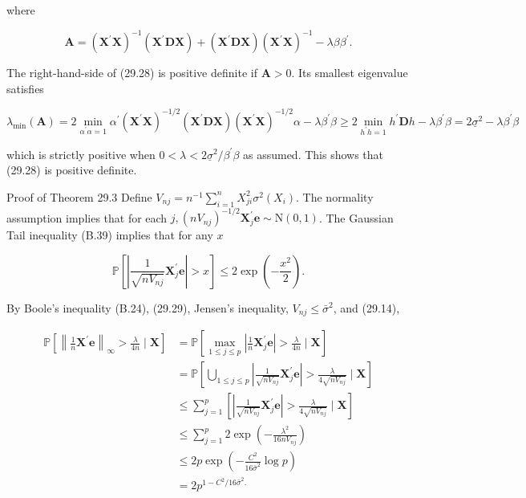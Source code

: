 \documentclass[10pt]{article}
\begin{document}
where

$$
\boldsymbol{A}=\left(\boldsymbol{X}^{\prime} \boldsymbol{X}\right)^{-1}\left(\boldsymbol{X}^{\prime} \boldsymbol{D} \boldsymbol{X}\right)+\left(\boldsymbol{X}^{\prime} \boldsymbol{D} \boldsymbol{X}\right)\left(\boldsymbol{X}^{\prime} \boldsymbol{X}\right)^{-1}-\lambda \beta \beta^{\prime} .
$$

The right-hand-side of (29.28) is positive definite if $\boldsymbol{A}>0$. Its smallest eigenvalue satisfies

$$
\lambda_{\min }(\boldsymbol{A})=2 \min _{\alpha^{\prime} \alpha=1} \alpha^{\prime}\left(\boldsymbol{X}^{\prime} \boldsymbol{X}\right)^{-1 / 2}\left(\boldsymbol{X}^{\prime} \boldsymbol{D} \boldsymbol{X}\right)\left(\boldsymbol{X}^{\prime} \boldsymbol{X}\right)^{-1 / 2} \alpha-\lambda \beta^{\prime} \beta \geq 2 \min _{h^{\prime} h=1} h^{\prime} \boldsymbol{D} h-\lambda \beta^{\prime} \beta=2 \underline{\sigma}^{2}-\lambda \beta^{\prime} \beta
$$

which is strictly positive when $0<\lambda<2 \underline{\sigma}^{2} / \beta^{\prime} \beta$ as assumed. This shows that (29.28) is positive definite.

Proof of Theorem 29.3 Define $V_{n j}=n^{-1} \sum_{i=1}^{n} X_{j i}^{2} \sigma^{2}\left(X_{i}\right)$. The normality assumption implies that for each $j,\left(n V_{n j}\right)^{-1 / 2} \boldsymbol{X}_{j}^{\prime} \boldsymbol{e} \sim \mathrm{N}(0,1)$. The Gaussian Tail inequality (B.39) implies that for any $x$

$$
\mathbb{P}\left[\left|\frac{1}{\sqrt{n V_{n j}}} \boldsymbol{X}_{j}^{\prime} \boldsymbol{e}\right|>x\right] \leq 2 \exp \left(-\frac{x^{2}}{2}\right) .
$$

By Boole's inequality (B.24), (29.29), Jensen's inequality, $V_{n j} \leq \bar{\sigma}^{2}$, and (29.14),

$$
\begin{aligned}
\mathbb{P}\left[\left\|\frac{1}{n} \boldsymbol{X}^{\prime} \boldsymbol{e}\right\|_{\infty}>\frac{\lambda}{4 n} \mid \boldsymbol{X}\right] &=\mathbb{P}\left[\max _{1 \leq j \leq p}\left|\frac{1}{n} \boldsymbol{X}_{j}^{\prime} \boldsymbol{e}\right|>\frac{\lambda}{4 n} \mid \boldsymbol{X}\right] \\
&=\mathbb{P}\left[\bigcup_{1 \leq j \leq p}\left|\frac{1}{\sqrt{n V_{n j}}} \boldsymbol{X}_{j}^{\prime} \boldsymbol{e}\right|>\frac{\lambda}{4 \sqrt{n V_{n j}}} \mid \boldsymbol{X}\right] \\
& \leq \sum_{j=1}^{p}\left[\left|\frac{1}{\sqrt{n V_{n j}}} \boldsymbol{X}_{j}^{\prime} \boldsymbol{e}\right|>\frac{\lambda}{4 \sqrt{n V_{n j}}} \mid \boldsymbol{X}\right] \\
& \leq \sum_{j=1}^{p} 2 \exp \left(-\frac{\lambda^{2}}{16 n V_{n j}}\right) \\
& \leq 2 p \exp \left(-\frac{C^{2}}{16 \bar{\sigma}^{2}} \log p\right) \\
&=2 p^{1-C^{2} / 16 \bar{\sigma}^{2} .}
\end{aligned}
$$
\end{document}
